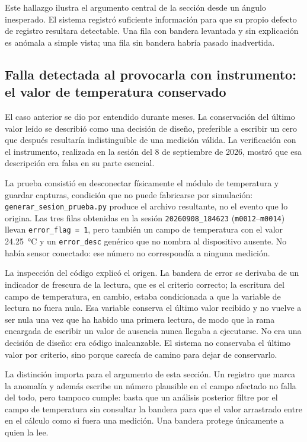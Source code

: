 Este hallazgo ilustra el argumento central de la sección desde un
ángulo inesperado. El sistema registró suficiente información para que
su propio defecto de registro resultara detectable. Una fila con
bandera levantada y sin explicación es anómala a simple vista; una fila
sin bandera habría pasado inadvertida.

\subsection{Falla detectada al provocarla con instrumento: el valor de
temperatura conservado}
\label{sec:falla_fantasma}

El caso anterior se dio por entendido durante meses. La conservación
del último valor leído se describió como una decisión de diseño,
preferible a escribir un cero que después resultaría indistinguible de
una medición válida. La verificación con el instrumento, realizada en
la sesión del 8 de septiembre de 2026, mostró que esa descripción era
falsa en su parte esencial.

La prueba consistió en desconectar físicamente el módulo de temperatura
y guardar capturas, condición que no puede fabricarse
por simulación: \texttt{generar\_sesion\_prueba.py} produce el archivo
resultante, no el evento que lo origina. Las tres filas obtenidas en la
sesión \texttt{20260908\_184623} (\texttt{m0012}--\texttt{m0014})
llevan \texttt{error\_flag = 1}, pero también un campo de temperatura
con el valor \SI{24.25}{\celsius} y un \texttt{error\_desc} genérico
que no nombra al dispositivo ausente. No había sensor conectado: ese
número no correspondía a ninguna medición.

La inspección del código explicó el origen. La bandera de error se
derivaba de un indicador de frescura de la lectura, que es el criterio
correcto; la escritura del campo de temperatura, en cambio, estaba
condicionada a que la variable de lectura no fuera nula. Esa variable
conserva el último valor recibido y no vuelve a ser nula una vez que ha
habido una primera lectura, de modo que la rama encargada de escribir
un valor de ausencia nunca llegaba a ejecutarse. No era una decisión de
diseño: era código inalcanzable. El sistema no conservaba el último
valor por criterio, sino porque carecía de camino para dejar de
conservarlo.

La distinción importa para el argumento de esta sección. Un registro
que marca la anomalía y además escribe un número plausible en el campo
afectado no falla del todo, pero tampoco cumple: basta que un análisis
posterior filtre por el campo de temperatura sin consultar la bandera
para que el valor arrastrado entre en el cálculo como si fuera una
medición. Una bandera protege únicamente a quien la lee.

